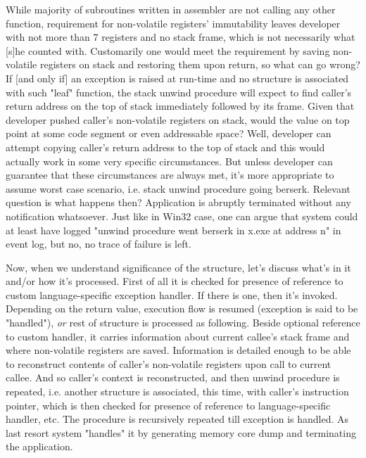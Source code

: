 While majority of subroutines written in assembler are not calling any
other function, requirement for non-volatile registers' immutability
leaves developer with not more than 7 registers and no stack frame,
which is not necessarily what [s]he counted with. Customarily one would
meet the requirement by saving non-volatile registers on stack and
restoring them upon return, so what can go wrong? If [and only if] an
exception is raised at run-time and no  structure is
associated with such "leaf" function, the stack unwind procedure will
expect to find caller's return address on the top of stack immediately
followed by its frame. Given that developer pushed caller's
non-volatile registers on stack, would the value on top point at some
code segment or even addressable space? Well, developer can attempt
copying caller's return address to the top of stack and this would
actually work in some very specific circumstances. But unless developer
can guarantee that these circumstances are always met, it's more
appropriate to assume worst case scenario, i.e. stack unwind procedure
going berserk. Relevant question is what happens then? Application is
abruptly terminated without any notification whatsoever. Just like in
Win32 case, one can argue that system could at least have logged
"unwind procedure went berserk in x.exe at address n" in event log, but
no, no trace of failure is left.

Now, when we understand significance of the  structure,
let's discuss what's in it and/or how it's processed. First of all it
is checked for presence of reference to custom language-specific
exception handler. If there is one, then it's invoked. Depending on the
return value, execution flow is resumed (exception is said to be
"handled"), \emph{or} rest of  structure is processed as
following. Beside optional reference to custom handler, it carries
information about current callee's stack frame and where non-volatile
registers are saved. Information is detailed enough to be able to
reconstruct contents of caller's non-volatile registers upon call to
current callee. And so caller's context is reconstructed, and then
unwind procedure is repeated, i.e. another  structure is
associated, this time, with caller's instruction pointer, which is then
checked for presence of reference to language-specific handler, etc.
The procedure is recursively repeated till exception is handled. As
last resort system "handles" it by generating memory core dump and
terminating the application.

